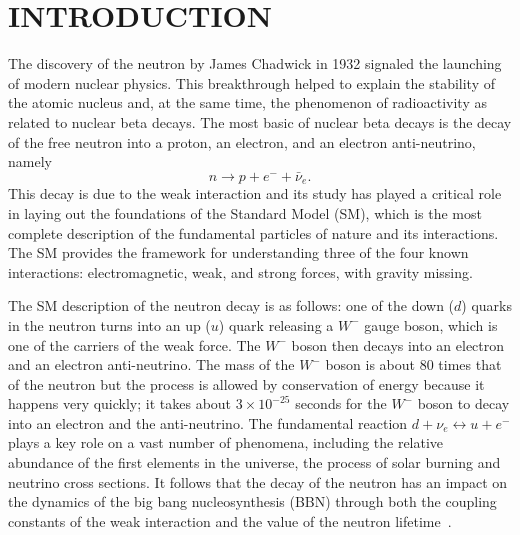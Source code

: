 \documentclass[oneside,12pt]{memoir}
\begin{document}
\chapter{INTRODUCTION}
\label{ch:intro}
The discovery of the neutron by James Chadwick in 1932 signaled the launching of modern nuclear physics. This breakthrough helped to explain the stability of the atomic nucleus and, at the same time, the phenomenon of radioactivity as related to nuclear beta decays. The most basic of nuclear beta decays is the decay of the free neutron into a proton, an electron, and an electron anti-neutrino, namely
\begin{equation}
n\longrightarrow p + e^{-} + \bar{\nu}_{e}.
\end{equation}
This decay is due to the weak interaction and its study has played a critical role in laying out the foundations of the Standard Model (SM), which is the most complete description of the fundamental particles of nature and its interactions. The SM provides the framework for understanding three of the four known interactions: electromagnetic, weak, and strong forces, with gravity missing.\par
The SM description of the neutron decay is as follows: one of the down ($d$) quarks in the neutron turns into an up ($u$) quark releasing a $W^{-}$ gauge boson, which is one of the carriers of the weak force. The $W^{-}$ boson then decays into an electron and an electron anti-neutrino. The mass of the $W^{-}$ boson is about 80 times that of the neutron but the process is allowed by conservation of energy because it happens very quickly; it takes about $3\times 10^{-25}$ seconds for the $W^{-}$ boson to decay into an electron and the anti-neutrino. The fundamental reaction $d+\nu_{e}\leftrightarrow u+e^{-}$ plays a key role on a vast number of phenomena, including the relative abundance of the first elements in the universe, the process of solar burning and neutrino cross sections. It follows that the decay of the neutron has an impact on the dynamics of the big bang nucleosynthesis (BBN) through both the coupling constants of the weak interaction and the value of the neutron lifetime~\cite{Dubbers11}.\par
\end{document}
